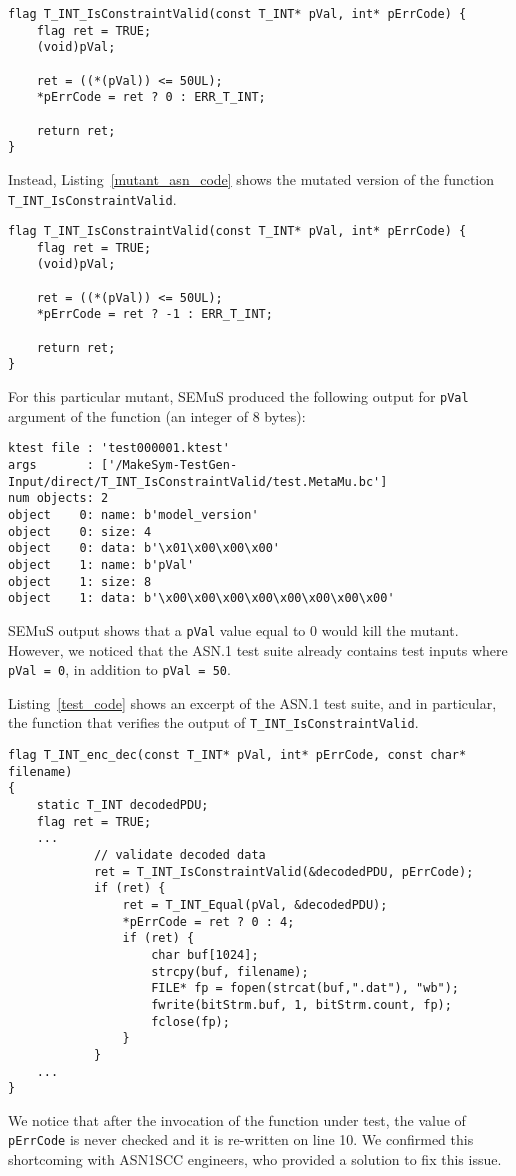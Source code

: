\begin{lstlisting}[style=CStyle, caption=Original code., label=original_asn_code]
flag T_INT_IsConstraintValid(const T_INT* pVal, int* pErrCode) {
    flag ret = TRUE;
    (void)pVal;

    ret = ((*(pVal)) <= 50UL);
    *pErrCode = ret ? 0 : ERR_T_INT; 

    return ret;
}
\end{lstlisting}

Instead, Listing~\ref{mutant_asn_code} shows the mutated version of the function \texttt{T\_INT\_IsConstraintValid}.

\begin{lstlisting}[style=CStyle, caption=Mutant code., label=mutant_asn_code]
flag T_INT_IsConstraintValid(const T_INT* pVal, int* pErrCode) {
    flag ret = TRUE;
    (void)pVal;

    ret = ((*(pVal)) <= 50UL);
    *pErrCode = ret ? -1 : ERR_T_INT;

    return ret;
}
\end{lstlisting}

For this particular mutant, SEMuS produced the following output for \texttt{pVal} argument of the function (an integer of 8 bytes):

\begin{lstlisting}[language={}, caption=Klee-test output, label=ktest]
ktest file : 'test000001.ktest'
args       : ['/MakeSym-TestGen-Input/direct/T_INT_IsConstraintValid/test.MetaMu.bc']
num objects: 2
object    0: name: b'model_version'
object    0: size: 4
object    0: data: b'\x01\x00\x00\x00'
object    1: name: b'pVal'
object    1: size: 8
object    1: data: b'\x00\x00\x00\x00\x00\x00\x00\x00'
\end{lstlisting}

SEMuS output shows that a \texttt{pVal} value equal to 0 would kill the mutant. However, we noticed that the ASN.1 test suite already contains test inputs where \texttt{pVal = 0}, in addition to \texttt{pVal = 50}.

Listing~\ref{test_code} shows an excerpt of the ASN.1 test suite, and in particular, the function that verifies the output of \texttt{T\_INT\_IsConstraintValid}. 

\begin{lstlisting}[style=CStyle, caption=ASN.1 test code., label=test_code]
flag T_INT_enc_dec(const T_INT* pVal, int* pErrCode, const char* filename)
{
    static T_INT decodedPDU;
    flag ret = TRUE;
    ...
            // validate decoded data
            ret = T_INT_IsConstraintValid(&decodedPDU, pErrCode); 
            if (ret) {
                ret = T_INT_Equal(pVal, &decodedPDU);
                *pErrCode = ret ? 0 : 4;
                if (ret) {
                    char buf[1024];
                    strcpy(buf, filename);
                    FILE* fp = fopen(strcat(buf,".dat"), "wb");
                    fwrite(bitStrm.buf, 1, bitStrm.count, fp);
                    fclose(fp);
                }
            }
    ...
}
\end{lstlisting}

We notice that after the invocation of the function under test, the value of \texttt{pErrCode} is never checked and it is re-written on line 10. We confirmed this shortcoming with ASN1SCC engineers, who provided a solution to fix this issue.